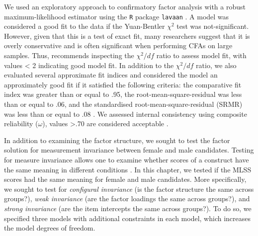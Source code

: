 \documentclass[
  12pt,
  a4paper,
]{book}
\begin{document}
We used an exploratory approach to confirmatory factor analysis with a robust maximum-likelihood estimator using the \texttt{R} package \texttt{lavaan} \citep{R-lavaan}. A model was considered a good fit to the data if the Yuan-Bentler \citep[Y-B;][]{Yuan1997} \(\chi^2\) test was not-significant. However, given that this is a test of exact fit, many researchers suggest that it is overly conservative and is often significant when performing CFAs on large samples. Thus, \citet{Joreskog1989} recommends inspecting the \(\chi^2/df\) ratio to assess model fit, with values \textless{} 2 indicating good model fit. In addition to the \(\chi^2/df\) ratio, we also evaluated several approximate fit indices and considered the model an approximately good fit if it satisfied the following criteria: the comparative fit index \citep[CFI;][]{Bentler1990} was greater than or equal to .95, the root-mean-square-residual \citep[RMSEA;][]{Steiger1990} was less than or equal to .06, and the standardised root-mean-square-residual (SRMR) was less than or equal to .08 \citep{Hu1999}. We assessed internal consistency using composite reliability (\(\omega\)), values \textgreater.70 are considered acceptable \citep{Fornell1981}.

In addition to examining the factor structure, we sought to test the factor solution for measurement invariance between female and male candidates. Testing for measure invariance allows one to examine whether scores of a construct have the same meaning in different conditions \citep{Meade2004}. In this chapter, we tested if the MLSS scores had the same meaning for female and male candidates. More specifically, we sought to test for \emph{configural invariance} (is the factor structure the same across groups?), \emph{weak invariance} (are the factor loadings the same across groups?), and \emph{strong invariance} (are the item intercepts the same across groups?). To do so, we specified three models with additional constraints in each model, which increases the model degrees of freedom.
\end{document}

